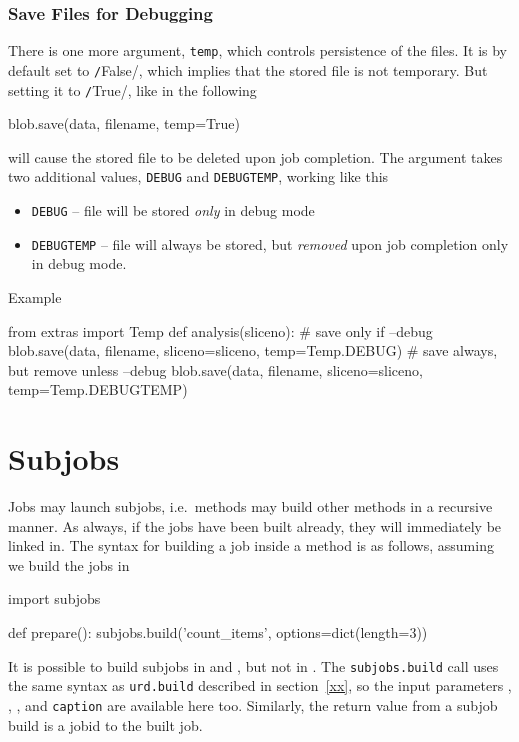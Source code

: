 \subsubsection*{Save Files for Debugging}
There is one more argument, \texttt{temp}, which controls persistence
of the files.  It is by default set to \texttt/False/,
which implies that the stored file is not temporary.  But setting it
to \texttt/True/, like in the following
\begin{python}
    blob.save(data, filename, temp=True)
\end{python}
will cause the stored file to be deleted upon job completion.  The
argument takes two additional values, \texttt{DEBUG} and
\texttt{DEBUGTEMP}, working like this
\begin{itemize}
\item[] \texttt{DEBUG} -- file will be stored \emph{only} in debug
  mode
\item[] \texttt{DEBUGTEMP} -- file will always be stored, but
  \emph{removed} upon job completion only in debug mode.
\end{itemize}
Example
\begin{python}
from extras import Temp
def analysis(sliceno):
  # save only if --debug
  blob.save(data, filename, sliceno=sliceno, temp=Temp.DEBUG)
  # save always, but remove unless --debug
  blob.save(data, filename, sliceno=sliceno, temp=Temp.DEBUGTEMP)
\end{python}


\newpage
\section{Subjobs}

Jobs may launch subjobs, i.e.\ methods may build other methods in a
recursive manner.  As always, if the jobs have been built already,
they will immediately be linked in.  The syntax for building a job
inside a method is as follows, assuming we build the jobs in \prepare
\begin{python}
import subjobs

def prepare():
  subjobs.build('count_items', options=dict(length=3))
\end{python}
It is possible to build subjobs in \prepare and \synthesis, but not in
\analysis.    The \texttt{subjobs.build} call uses the
same syntax as \texttt{urd.build} described in section~\ref{xx}, so
the input parameters \options, \datasets, \jobids, and
\texttt{caption} are available here too.  Similarly, the return value
from a subjob build is a jobid to the built job.

